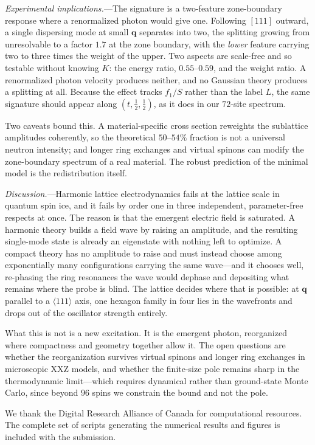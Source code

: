 \documentclass[
aps,prl,twocolumn,amsmath,amssymb,superscriptaddress,
longbibliography,floatfix
]{revtex4-2}
\newcommand{\bq}{\bm q}
\begin{document}
\emph{Experimental implications.}---The signature is a two-feature
zone-boundary response where a renormalized photon would give one.
Following $[111]$ outward, a single dispersing mode at small $\bq$
separates into two, the splitting growing from unresolvable to a factor
$1.7$ at the zone boundary, with the \emph{lower} feature carrying two to
three times the weight of the upper. Two aspects are scale-free and so
testable without knowing $K$: the energy ratio, $0.55$--$0.59$, and the
weight ratio. A renormalized photon velocity produces neither, and no
Gaussian theory produces a splitting at all. Because the effect tracks
$f_1/S$ rather than the label $L$, the same signature should appear along
$(t,\frac12,\frac12)$, as it does in our $72$-site spectrum.

Two caveats bound this. A material-specific cross section reweights the
sublattice amplitudes coherently, so the theoretical $50$--$54\%$
fraction is not a universal neutron intensity; and longer ring exchanges
and virtual spinons can modify the zone-boundary spectrum of a real
material. The robust prediction of the minimal model is the
redistribution itself.

\emph{Discussion.}---Harmonic lattice electrodynamics fails at the
lattice scale in quantum spin ice, and it fails by order one in three
independent, parameter-free respects at once. The reason is that the
emergent electric field is saturated. A harmonic theory builds a field
wave by raising an amplitude, and the resulting single-mode state is
already an eigenstate with nothing left to optimize. A compact theory has
no amplitude to raise and must instead choose among exponentially many
configurations carrying the same wave---and it chooses well, re-phasing
the ring resonances the wave would dephase and depositing what remains
where the probe is blind. The lattice decides where that is possible: at
$\bq$ parallel to a $\langle111\rangle$ axis, one hexagon family in four
lies in the wavefronts and drops out of the oscillator strength entirely.

What this is not is a new excitation. It is the emergent photon,
reorganized where compactness and geometry together allow it. The open
questions are whether the reorganization survives virtual spinons and
longer ring exchanges in microscopic XXZ models, and whether the
finite-size pole remains sharp in the thermodynamic limit---which
requires dynamical rather than ground-state Monte Carlo, since beyond
$96$ spins we constrain the bound and not the pole.

\begin{acknowledgments}
We thank the Digital Research Alliance of Canada for computational
resources. The complete set of scripts generating the numerical
results and figures is included with the submission.
\end{acknowledgments}



\end{document}
